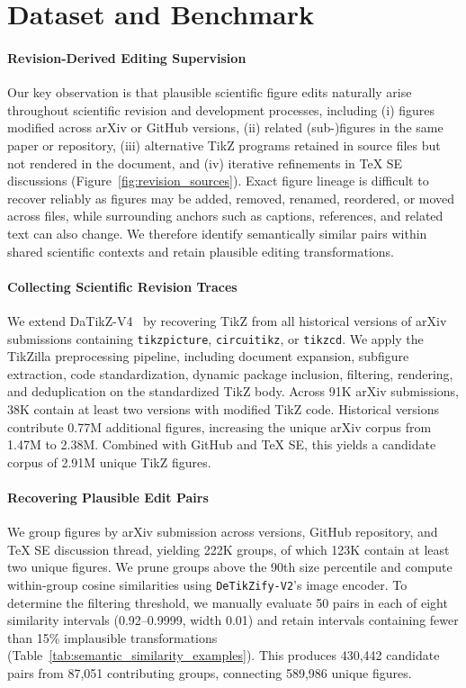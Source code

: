 \section{Dataset and Benchmark}
\label{sec:Dataset and Benchmark}

\paragraph{Revision-Derived Editing Supervision}
Our key observation is that plausible scientific figure edits naturally arise throughout scientific revision and development processes, including (i) figures modified across arXiv or GitHub versions, (ii) related (sub-)figures in the same paper or repository, (iii) alternative TikZ programs retained in source files but not rendered in the document, and (iv) iterative refinements in TeX SE discussions (Figure~\ref{fig:revision_sources}). Exact figure lineage is difficult to recover reliably as figures may be added, removed, renamed, reordered, or moved across files, while surrounding anchors such as captions, references, and related text can also change. We therefore identify semantically similar pairs within shared scientific contexts and retain plausible editing transformations.



\paragraph{Collecting Scientific Revision Traces}
We extend DaTikZ-V4~\citep{greisinger2026tikzilla} by recovering TikZ from all historical versions of arXiv submissions containing \texttt{tikzpicture}, \texttt{circuitikz}, or \texttt{tikzcd}. We apply the TikZilla preprocessing pipeline, including document expansion, subfigure extraction, code standardization, dynamic package inclusion, filtering, rendering, and deduplication on the standardized TikZ body. Across 91K arXiv submissions, 38K contain at least two versions with modified TikZ code. Historical versions contribute 0.77M additional figures, increasing the unique arXiv corpus from 1.47M to 2.38M. Combined with GitHub and TeX SE, this yields a candidate corpus of 2.91M unique TikZ figures.

\paragraph{Recovering Plausible Edit Pairs}
We group figures by arXiv submission across versions, GitHub repository, and TeX SE discussion thread, yielding 222K groups, of which 123K contain at least two unique figures. We prune groups above the 90th size percentile and compute within-group cosine similarities using \texttt{DeTikZify-V2}'s image encoder. To determine the filtering threshold, we manually evaluate 50 pairs in each of eight similarity intervals (0.92--0.9999, width 0.01) and retain intervals containing fewer than 15\% implausible transformations (Table~\ref{tab:semantic_similarity_examples}). This produces 430,442 candidate pairs from 87,051 contributing groups, connecting 589,986 unique figures.

